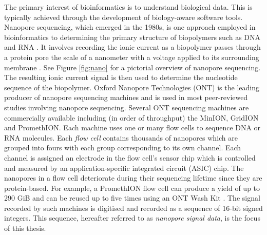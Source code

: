 The primary interest of bioinformatics is to understand biological data. This is typically achieved through the development of biology-aware software tools. Nanopore sequencing, which emerged in the 1980s, is one approach employed in bioinformatics to determining the primary structure of biopolymers such as DNA and RNA \cite{three-decades-nano}. It involves recording the ionic current as a biopolymer passes through a protein pore the scale of a nanometer with a voltage applied to its surrounding membrane \cite{Wang2021}. See Figure \ref{fig:nano} for a pictorial overview of nanopore sequencing. The resulting ionic current signal is then used to determine the nucleotide sequence of the biopolymer. Oxford Nanopore Technologies (ONT) is the leading producer of nanopore sequencing machines and is used in most peer-reviewed studies involving nanopore sequencing. Several ONT sequencing machines are commercially available including (in order of throughput) the MinION, GridION and PromethION.
Each machine uses one or many flow cells to sequence DNA or RNA molecules. Each \textit{flow cell} contains thousands of nanopores which are grouped into fours with each group corresponding to its own channel. Each channel is assigned an electrode in the flow cell's sensor chip which is controlled and measured by an application-specific integrated circuit (ASIC) chip. The nanopores in a flow cell deteriorate during their sequencing lifetime since they are protein-based. For example, a PromethION flow cell can produce a yield of up to 290 GiB and can be reused up to five times using an ONT Wash Kit \cite{nano-web}.
The signal recorded by such machines is digitised and recorded as a sequence of 16-bit signed integers. This sequence, hereafter referred to as \textit{nanopore signal data}, is the focus of this thesis.


